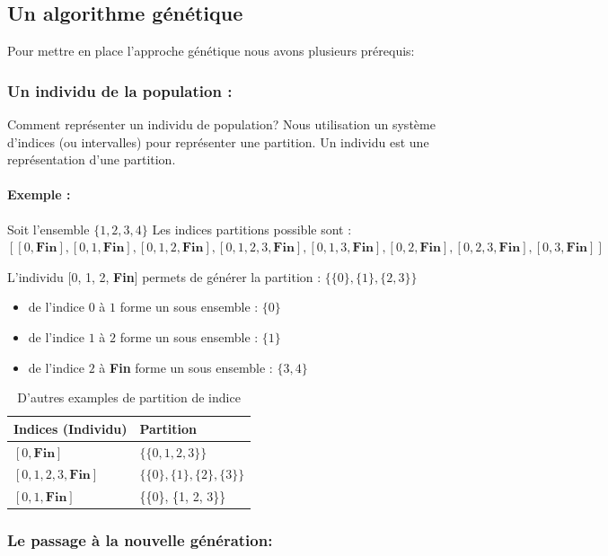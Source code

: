 \documentclass[runningheads]{llncs}
\begin{document}
\subsection{Un algorithme g\'en\'etique}
Pour mettre en place l'approche génétique nous avons plusieurs prérequis:
\subsubsection{Un individu de la population :} Comment représenter un individu de population?
Nous utilisation un système d'indices (ou intervalles) pour représenter une partition. 
Un individu est une représentation d'une partition.

\paragraph{Exemple : } Soit l'ensemble $\{1, 2, 3, 4\}$ 
Les indices partitions possible sont :
$[[0, \textbf{Fin}], [0,1, \textbf{Fin}], [0,1, 2, \textbf{Fin}], [0,1, 2, 3, \textbf{Fin}], [0,1, 3, \textbf{Fin}], [0,2, \textbf{Fin}], [0,2, 3, \textbf{Fin}], [0,3, \textbf{Fin}]]$

L'individu [0, 1, 2, \textbf{Fin}] permets de générer la partition :  $\{\{0\}, \{1\}, \{2, 3\}\}$
\begin{itemize}
    \item de l'indice $0$ \`a $1$ forme un sous ensemble : $\{0\}$
    \item de l'indice $1$ \`a $2$ forme un sous ensemble : $\{1\}$
    \item de l'indice $2$ \`a \textbf{Fin} forme un sous ensemble : $\{3, 4\}$
\end{itemize}
\begin{table}[H]
\centering
\caption{D'autres examples de partition de indice}\label{tab1}
\begin{tabular}{|l|l|}
\hline
Indices (Individu) &  Partition \\
\hline
$[0, \textbf{Fin}]$&  $\{\{0, 1, 2, 3\}\}$\\
$[0,1, 2, 3, \textbf{Fin}]$ & $\{\{0\}, \{1\}, \{2\}, \{3\}\}$\\
$[0,1, \textbf{Fin}]$ & \{\{0\}, \{1, 2, 3\}\}\\
\hline
\end{tabular}
\end{table}

\subsubsection{Le passage à la nouvelle génération:}
\end{document}
